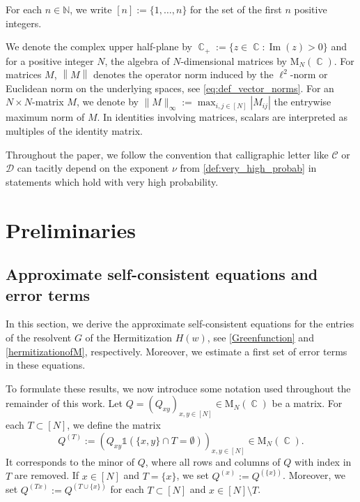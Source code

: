 \documentclass[10pt,a4paper]{amsart}
\DeclareMathOperator{\Ima}{Im}
\DeclareMathOperator{\CC}{\mathbb{C}}
\newcommand{\norm}[1]{\left\| #1 \right\|}
\newcommand{\N}{\mathbb{N}}
\numberwithin{equation}{section}
\begin{document}
	For each $n \in \N$, we write $[n] := \{1, \ldots, n\}$ for the set of the first $n$ positive integers. 
	
	

	
	We denote the complex upper half-plane by $\CC_+ := \{ z \in \CC\colon \Ima(z)>0\}$ and for a positive integer $N$, 
the algebra of $N$-dimensional matrices by $\mathrm{M}_N (\CC)$. For matrices $M$, 
	$\norm{M}$ denotes the operator norm induced by the $\ell^2$-norm or Euclidean norm on the underlying spaces, see \cref{eq:def_vector_norms}. 
	For an $N\times N$-matrix $M$, we denote by $\|M\|_{\infty}:= \max_{i,j \in [N]} |M_{ij}|$ the entrywise maximum norm of $M$. 
	In identities involving matrices, scalars are interpreted as multiples of the identity matrix. 

	Throughout the paper, we follow the convention that calligraphic letter like $\mathcal C$ or $\mathcal D$ can tacitly depend on the exponent $\nu$ from \cref{def:very_high_probab} in statements which hold with very high probability. 


\section{Preliminaries} 

	\subsection{Approximate self-consistent equations and error terms}\label{subsection:Approx_sc_eq} 
	
	In this section, we derive the approximate self-consistent equations for the entries of the resolvent $G$ of the Hermitization $H(w)$, see \cref{Greenfunction} and \cref{hermitizationofM}, respectively. Moreover, we estimate a first set of error terms in these equations. 
	
	To formulate these results, we now introduce some notation used throughout the remainder of this work. 
	Let $Q=(Q_{xy})_{x,y \in [N]} \in \mathrm{M}_N(\CC)$ be a matrix. For each $T \subset [N]$, we define the matrix 
	\begin{equation}\label{eq:def_M_(_T_)} 
		Q^{(T)}:= (Q_{xy}\mathds{1}\left(\{x,y\} \cap T = \emptyset\right))_{x,y\in [N]} \in \mathrm{M}_{N}(\CC). 
	\end{equation}
	It corresponds to the minor of $Q$, where all rows and columns of $Q$ with index in $T$ are removed. 
	If $x \in [N]$ and $T= \{x\}$, we set $Q^{(x)} := Q^{(\{x\})}$. Moreover,  we set $Q^{(Tx)}:=Q^{(T\cup \{x\})}$ for each $T \subset [N]$ and $x \in [N] \setminus T$.
	
\end{document}
